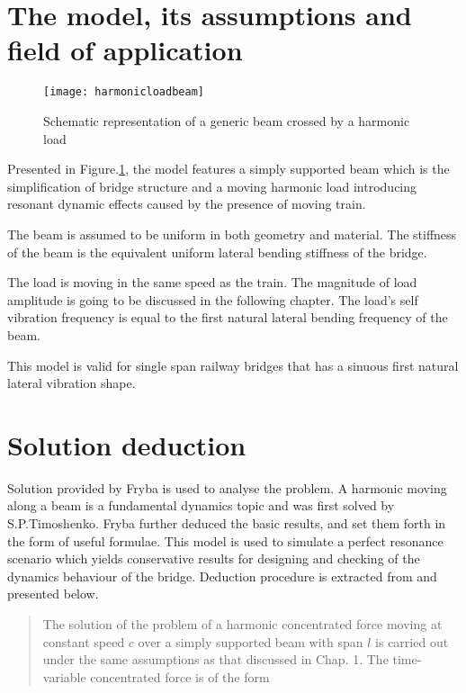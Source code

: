 \begin{appendices}
\section{The model, its assumptions and field of application}

\begin{figure}[h]
    \centering
    \texttt{[image: harmonicloadbeam]}
    \caption{Schematic representation of a generic beam crossed by a harmonic load}
    \label{fig:harmonicloadbeam}
\end{figure}

Presented in Figure.\ref{fig:harmonicloadbeam}, the model features a simply supported beam which is the simplification of bridge structure and a moving harmonic load introducing resonant dynamic effects caused by the presence of moving train.

The beam is assumed to be uniform in both geometry and material. The stiffness of the beam is the equivalent uniform lateral bending stiffness of the bridge. 

The load is moving in the same speed as the train. The magnitude of load amplitude is going to be discussed in the following chapter. The load's self vibration frequency is equal to the first natural lateral bending frequency of the beam.


This model is valid for single span railway bridges that has a sinuous first natural lateral vibration shape.  

\section{Solution deduction}

Solution provided by Fryba\citet{fryba1999vibration} is used to analyse the problem. A harmonic moving along a beam is a fundamental dynamics topic and was first solved by S.P.Timoshenko. Fryba further deduced the basic results, and set them forth in the form of useful formulae. This model is used to simulate a perfect resonance scenario which yields conservative results for designing and checking of the dynamics behaviour of the bridge. Deduction procedure is extracted from \citet[Section II.2.1]{fryba1999vibration} and presented below.

\begin{quote}

The solution of the problem of a harmonic concentrated force moving at constant speed $c$ over a simply supported beam with span $l$ is carried out under the same assumptions as that discussed in Chap. 1. The time-variable concentrated force is of the form


\end{quote}
\end{appendices}
